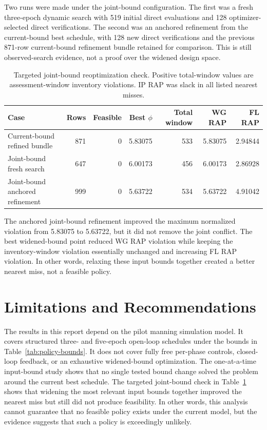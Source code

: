 \documentclass[10pt]{article}
\begin{document}
Two runs were made under the joint-bound configuration. The first was a fresh
three-epoch dynamic search with 519 initial direct evaluations and 128
optimizer-selected direct verifications. The second was an anchored refinement
from the current-bound best schedule, with 128 new direct verifications and the
previous 871-row current-bound refinement bundle retained for comparison. This
is still observed-search evidence, not a proof over the widened design space.

\begin{table}[htbp]
\centering
\caption{Targeted joint-bound reoptimization check. Positive total-window
values are assessment-window inventory violations. IP RAP was slack in all
listed nearest misses.}
\label{tab:joint-bound}
\begin{tabular}{lrrrrrr}
\toprule
Case & Rows & Feasible & Best $\phi$ & Total window & WG RAP & FL RAP \\
\midrule
Current-bound refined bundle & 871 & 0 & 5.83075 & 533 & 5.83075 & 2.94844 \\
Joint-bound fresh search & 647 & 0 & 6.00173 & 456 & 6.00173 & 2.86928 \\
Joint-bound anchored refinement & 999 & 0 & 5.63722 & 534 & 5.63722 & 4.91042 \\
\bottomrule
\end{tabular}
\end{table}

The anchored joint-bound refinement improved the maximum normalized violation
from 5.83075 to 5.63722, but it did not remove the joint conflict. The best
widened-bound point reduced WG RAP violation while keeping the inventory-window
violation essentially unchanged and increasing FL RAP violation. In other
words, relaxing these input bounds together created a better nearest miss, not
a feasible policy.

\section{Limitations and Recommendations}

The results in this report depend on the pilot manning simulation model.
It covers structured three- and five-epoch open-loop schedules under the bounds
in Table~\ref{tab:policy-bounds}. It does not cover fully free per-phase
controls, closed-loop feedback, or an exhaustive widened-bound optimization.
The one-at-a-time input-bound study shows that no single tested bound change
solved the problem around the current best schedule. The targeted joint-bound
check in Table~\ref{tab:joint-bound} shows that widening the most relevant
input bounds together improved the nearest miss but still did not produce
feasibility. In other words, this analysis cannot guarantee that no feasible
policy exists under the current model, but the evidence suggests that such a
policy is exceedingly unlikely.
\end{document}
